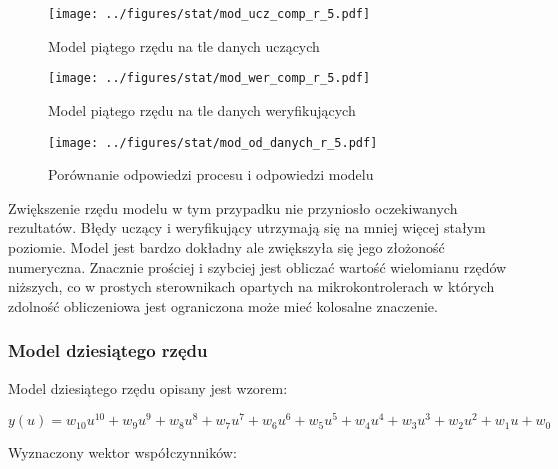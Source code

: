 \documentclass[a4paper,titlepage,11pt,floatssmall]{mwrep}
\begin{document}
\newpage

\begin{figure}[H]
\centering
\texttt{[image: ../figures/stat/mod\_ucz\_comp\_r\_5.pdf]}
\caption{Model piątego rzędu na tle danych uczących}
\end{figure}

\begin{figure}[H]
\centering
\texttt{[image: ../figures/stat/mod\_wer\_comp\_r\_5.pdf]}
\caption{Model piątego rzędu na tle danych weryfikujących}
\end{figure}

\newpage

\begin{figure}[H]
\centering
\texttt{[image: ../figures/stat/mod\_od\_danych\_r\_5.pdf]}
\caption{Porównanie odpowiedzi procesu i odpowiedzi modelu}
\end{figure}

Zwiększenie rzędu modelu w tym przypadku nie przyniosło oczekiwanych rezultatów. Błędy uczący i weryfikujący utrzymają się na mniej więcej stałym poziomie. Model jest bardzo dokładny ale zwiększyła się jego złożoność numeryczna. Znacznie prościej i szybciej jest obliczać wartość wielomianu rzędów niższych, co w  prostych sterownikach opartych na mikrokontrolerach w których zdolność obliczeniowa jest ograniczona może mieć kolosalne znaczenie.

\subsubsection{Model dziesiątego rzędu}
Model dziesiątego rzędu opisany jest wzorem:

\begin{equation*}
y(u) = w_{10}u^{10} + w_9u^9 + w_8u^8 + w_7u^7 + w_6u^6 + w_5u^5 + w_4u^4 + w_3u^3 + w_2u^2 + w_1u + w_0
\end{equation*}

Wyznaczony wektor współczynników:
\end{document}
